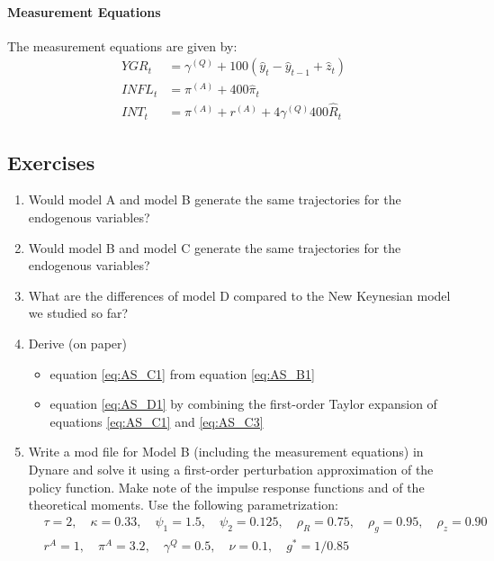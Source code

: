 \paragraph{Measurement Equations}
The measurement equations are given by:
\begin{align}
YGR_t &= \gamma^{(Q)} + 100(\hat{y}_t-\hat{y}_{t-1} + \hat{z}_t)
\\
INFL_t &= \pi^{(A)} + 400 \hat{\pi}_t
\\
INT_t &= \pi^{(A)} + r^{(A)} + 4 \gamma^{(Q)} 400 \hat{R}_t
\end{align}

\subsection*{Exercises}
\begin{enumerate}
\item Would model A and model B generate the same trajectories for the endogenous variables?
  
\item Would model B and model C generate the same trajectories for the endogenous variables?

\item What are the differences of model D compared to the New Keynesian model we studied so far?
  
\item Derive (on paper)
\begin{itemize}
    \item equation \eqref{eq:AS_C1} from equation \eqref{eq:AS_B1}
    \item equation \eqref{eq:AS_D1} by combining the first-order Taylor expansion of equations \eqref{eq:AS_C1} and \eqref{eq:AS_C3}
\end{itemize}

\item Write a mod file for Model B (including the measurement equations) in Dynare
  and solve it using a first-order perturbation approximation of the policy function.
Make note of the impulse response functions and of the theoretical moments.
Use the following parametrization:
\begin{align*}
&\tau=2,\quad \kappa=0.33,\quad \psi_1=1.5,\quad \psi_2=0.125,\quad \rho_R=0.75,\quad \rho_g=0.95,\quad \rho_z=0.90
\\
&r^{A}=1,\quad \pi^{A}=3.2,\quad \gamma^{Q}= 0.5,\quad \nu=0.1,\quad g^*=1/0.85
\end{align*}


\end{enumerate}
